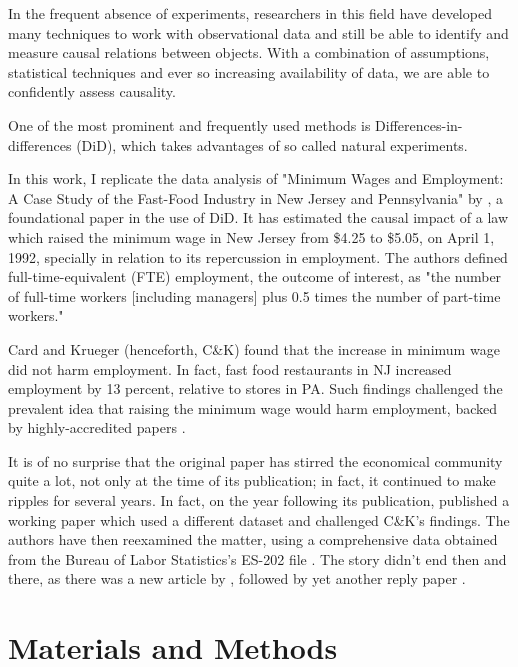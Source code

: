 \documentclass[11pt]{article}
\begin{document}
In the frequent absence of experiments, researchers in this field have developed many techniques to work with observational data and still be able to identify and measure causal relations between objects. With a combination of assumptions, statistical techniques and ever so increasing availability of data, we are able to confidently assess causality.

One of the most prominent and frequently used methods is Differences-in-differences (DiD), which takes advantages of so called natural experiments.

In this work, I replicate the data analysis of "Minimum Wages and Employment: A Case Study of the Fast-Food Industry in New Jersey and Pennsylvania" by \citet{RePEc:aea:aecrev:v:84:y:1994:i:4:p:772-93}, a foundational paper in the use of DiD. It has estimated the causal impact of a law which raised the minimum wage in New Jersey from \$4.25 to \$5.05, on April 1, 1992, specially in relation to its repercussion in employment. The authors defined full-time-equivalent (FTE) employment, the outcome of interest, as "the number of full-time workers [including managers] plus 0.5 times the number of part-time workers."

 Card and Krueger (henceforth, C\&K) found that the increase in minimum wage did not harm employment. In fact, fast food restaurants in NJ increased employment by 13 percent, relative to stores in PA. Such findings challenged the prevalent idea that raising the minimum wage would harm employment, backed by highly-accredited papers \citep{stigler_minimum,effect_kohen}. 
 
 It is of no surprise that the original paper has stirred the economical community quite a lot, not only at the time of its publication; in fact, it continued to make ripples for several years. In fact, on the year following its publication, \citet{neumark_1} published a working paper which used a different dataset and challenged C\&K's findings. The authors have then reexamined the matter, using a comprehensive data obtained from the Bureau of Labor Statistics's ES-202 file \citep{card_reanalysis}. The story didn't end then and there, as there was a new article by \citet{Neumark_comment}, followed by yet another reply paper \citep{card_reply}.

\section{Materials and Methods}
\end{document}
